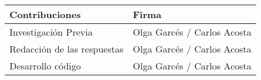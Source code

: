 \documentclass[
]{article}
\begin{document}
\begin{tabular}[t]{l|l}
\hline
Contribuciones & Firma\\
\hline
Investigación Previa & Olga Garcés / Carlos Acosta\\
\hline
Redacción de las respuestas & Olga Garcés / Carlos Acosta\\
\hline
Desarrollo código & Olga Garcés / Carlos Acosta\\
\hline
\end{tabular}

\texttt{}~\\
\texttt{}
\end{document}
